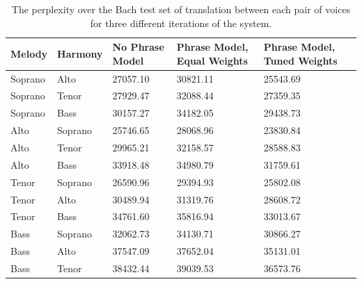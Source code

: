 \documentclass{sig-alternate}
\begin{document}
\begin{table}[h]
  \begin{center}
      \begin{tabular}{| l | l | l | l | l | l |}
      \hline
     Melody & Harmony & No Phrase Model & Phrase Model, Equal Weights & Phrase Model, Tuned Weights \\ \hline
     Soprano & Alto & 27057.10 & 30821.11 & 25543.69 \\ \hline
     Soprano & Tenor & 27929.47 & 32088.44 & 27359.35 \\ \hline
     Soprano & Bass & 30157.27 & 34182.05 & 29438.73 \\ \hline
     Alto & Soprano & 25746.65 & 28068.96 & 23830.84 \\ \hline
     Alto & Tenor & 29965.21 & 32158.57 & 28588.83 \\ \hline
     Alto & Bass & 33918.48 & 34980.79 & 31759.61 \\ \hline
     Tenor & Soprano & 26590.96 & 29394.93 & 25802.08 \\ \hline
     Tenor & Alto & 30489.94 & 31319.76 & 28608.72 \\ \hline
     Tenor & Bass & 34761.60 & 35816.94 & 33013.67 \\ \hline
     Bass & Soprano & 32062.73 & 34130.71 & 30866.27 \\ \hline
     Bass & Alto & 37547.09 & 37652.04 & 35131.01 \\ \hline
     Bass & Tenor & 38432.44 & 39039.53 & 36573.76 \\ \hline
      \end{tabular}
  \end{center}
  \caption{The perplexity over the Bach test set of translation between each pair of voices for three different iterations of the system.}
\end{table}
\end{document}
